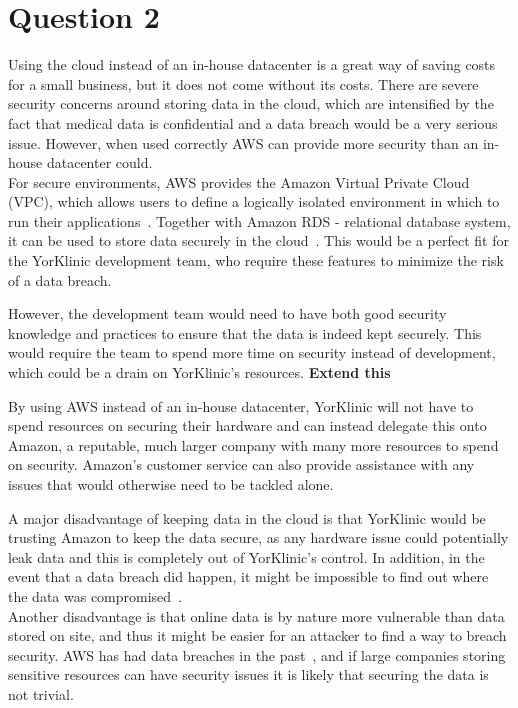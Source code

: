 \documentclass[11pt]{article}
\begin{document}
 \section*{Question 2}
Using the cloud instead of an in-house datacenter is a great way of saving costs for a small business, but it does not come without its costs. There are severe security concerns around storing data in the cloud, which are intensified by the fact that medical data is confidential and a data breach would be a very serious issue. However, when used correctly AWS can provide more security than an in-house datacenter could.\\

For secure environments, AWS provides the Amazon Virtual Private Cloud (VPC), which allows users to define a logically isolated environment in which to run their applications~\cite{vpc}. Together with Amazon RDS \-- relational database system, it can be used to store data securely in the cloud~\cite{rds}. This would be a perfect fit for the YorKlinic development team, who require these features to minimize the risk of a data breach.
    
However, the development team would need to have both good security knowledge and practices to ensure that the data is indeed kept securely. This would require the team to spend more time on security instead of development, which could be a drain on YorKlinic's resources. \textbf{Extend this}

By using AWS instead of an in-house datacenter, YorKlinic will not have to spend resources on securing their hardware and can instead delegate this onto Amazon, a reputable, much larger company with many more resources to spend on security. Amazon's customer service can also provide assistance with any issues that would otherwise need to be tackled alone.

A major disadvantage of keeping data in the cloud is that YorKlinic would be trusting Amazon to keep the data secure, as any hardware issue could potentially leak data and this is completely out of YorKlinic's control. In addition, in the event that a data breach did happen, it might be impossible to find out where the data was compromised~\cite{cloudrisk}.\\

Another disadvantage is that online data is by nature more vulnerable than data stored on site, and thus it might be easier for an attacker to find a way to breach security. AWS has had data breaches in the past~\cite{breach}, and if large companies storing sensitive resources can have security issues it is likely that securing the data is not trivial.
\end{document}
